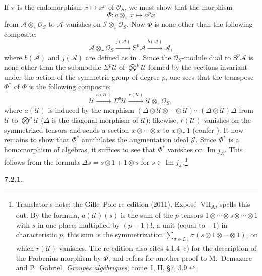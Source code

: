 If \(\pi\) is the endomorphism \(x\mapsto x^p\) of \(\mathcal O_S\), we
must show that the morphism
\[
  \Phi:a\otimes_{\pi}x\longmapsto a^px
\]
from \(\mathcal A\otimes_{\pi}\mathcal O_S\) to \(\mathcal A\) vanishes on
\(\mathcal I\otimes_{\pi}\mathcal O_S\). Now \(\Phi\) is none other than
the following composite:
\[
  \mathcal A\otimes_{\pi}\mathcal O_S
  \xrightarrow{j(\mathcal A)}
  \mathrm S^p\mathcal A
  \xrightarrow{b(\mathcal A)}
  \mathcal A,
\]
where \(b(\mathcal A)\) and \(j(\mathcal A)\) are defined as in
. Since the \(\mathcal O_S\)-module dual to
\(\mathrm S^p\mathcal A\) is none other than the submodule
\(\Sigma^p\mathcal U\) of \(\bigotimes^p\mathcal U\) formed by the
sections invariant under the action of the symmetric group of degree
\(p\), one sees that the transpose \(\Phi^{*}\) of \(\Phi\) is the
following composite:
\[
  \mathcal U
  \xrightarrow{a(\mathcal U)}
  \Sigma^p\mathcal U
  \xrightarrow{r(\mathcal U)}
  \mathcal U\otimes_{\pi}\mathcal O_S,
\]
where \(a(\mathcal U)\) is induced by the morphism
\((\Delta\otimes\mathcal U\otimes\cdots\otimes\mathcal U)\cdots
(\Delta\otimes\mathcal U)\Delta\) from \(\mathcal U\) to
\(\bigotimes^p\mathcal U\) (\(\Delta\) is the diagonal morphism of
\(\mathcal U\)); likewise, \(r(\mathcal U)\) vanishes on the symmetrized
tensors and sends a section \(x\otimes\cdots\otimes x\) to
\(x\otimes_{\pi}1\) (confer ). It now remains to show
that \(\Phi^{*}\) annihilates the augmentation ideal \(\mathcal J\).
Since \(\Phi^{*}\) is a homomorphism of algebras, it suffices to see that
\(\Phi^{*}\) vanishes on \(\operatorname{Im}j_{\mathcal L}\). This
follows from the formula \(\Delta s=s\otimes1+1\otimes s\) for
\(s\in\operatorname{Im}j_{\mathcal L}\).\footnote{Translator's note: the
Gille--Polo re-edition (2011), Expos\'e~VII\textsubscript{A}, spells this
out. By the formula, \(a(\mathcal U)(s)\) is the sum of the \(p\) tensors
\(1\otimes\cdots\otimes s\otimes\cdots\otimes1\) with \(s\) in one place;
multiplied by \((p-1)!\), a unit (equal to \(-1\)) in characteristic
\(p\), this sum is the symmetrization
\(\sum_{\sigma\in\mathfrak S_p}\sigma(s\otimes1\otimes\cdots\otimes1)\), on
which \(r(\mathcal U)\) vanishes. The re-edition also cites 4.1.4~c) for
the description of the Frobenius morphism by \(\Phi\), and refers for
another proof to M.~Demazure and P.~Gabriel, \textit{Groupes
alg\'ebriques}, tome~I, II, \S7, 3.9.}

\medskip
\noindent\textbf{7.2.1.}
\label{sga3:VIIA:7.2.1}

